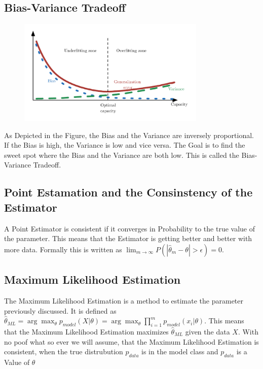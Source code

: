 \documentclass[a4paper]{article}
\begin{document}
\subsection{Bias-Variance Tradeoff}
\label{sec:Bias-Variance Tradeoff}
\begin{figure}[h]
    \centering
    \includegraphics[width=0.8\textwidth]{images/bias_variance_tradeoff.png}
    \caption{}
    \label{fig:}
\end{figure}

As Depicted in the Figure, the Bias and the Variance are inversely proportional. If the Bias is high, the Variance is low and vice versa. The Goal is to find the sweet spot where the Bias and the Variance are both low. This is called the Bias-Variance Tradeoff.

\subsection{Point Estamation and the Consinstency of the Estimator}
A Point Estimator is consistent if it converges in Probability to the true value of the parameter. This means that the Estimator is getting better and better with more data. Formally this is written as $\lim_{m \rightarrow \infty} P(|\hat{\theta}_m - \theta| > \epsilon) = 0$. 

\subsection{Maximum Likelihood Estimation}

The Maximum Likelihood Estimation is a method to estimate the parameter previously discussed. It is defined as $\hat{\theta}_{ML} = \arg \max_{\theta} p_{model}(X|\theta) = \arg \max_{\theta} \prod_{i = 1}^{m} p_{model}(x_{i}|\theta)$. This means that the Maximum Likelihood Estimation maximizes  $ \hat{\theta}_{ML} $ given the data $X$.
With no poof what so ever we will assume, that the Maximum Likelihood Estimation is consistent, when the true distrubution $p_{data} $ is in the model class and $p_{data}$ is a Value of $\theta$ 
\end{document}
